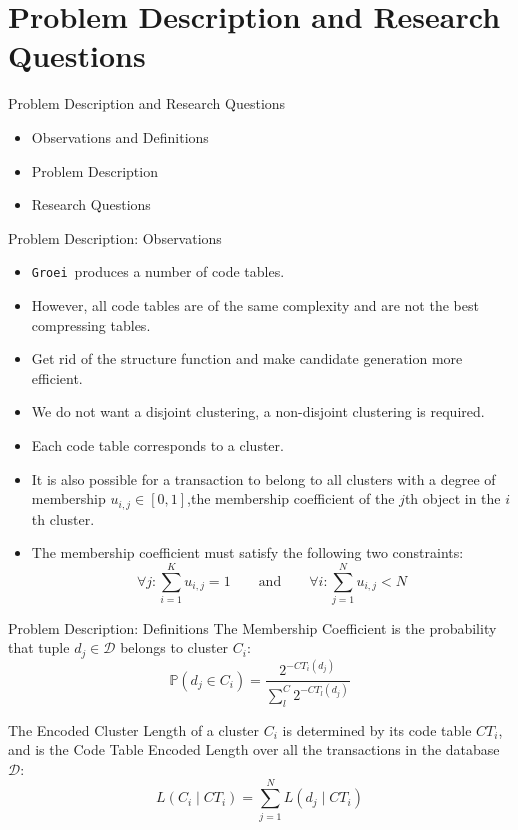 \documentclass{beamer}
\newcommand{\codetable}{CT}
\newcommand{\dataset}{\mathcal{D}}
\newcommand{\groei}{\texttt{Groei}}
\newcommand{\prob}{\mathbb{P}}
\begin{document}
\section{Problem Description and Research Questions}
\begin{frame}{Problem Description and Research Questions}
	\begin{itemize}
		\item Observations and Definitions
		\item Problem Description
		\item Research Questions
	\end{itemize}
\end{frame}

\begin{frame}{Problem Description: Observations}
\begin{itemize}
	\item \groei\ produces a number of code tables.
	\item However, all code tables are of the same complexity and are not the best compressing tables.
	\item Get rid of the structure function and make candidate generation more efficient.
	\item We do not want a disjoint clustering, a non-disjoint clustering is required.
	\item Each code table corresponds to a cluster.
	\item It is also possible for a transaction to belong to all clusters with a degree of membership $u_{i,j} \in [0,1]$,the membership coefficient of the $j$th object in the $i$th cluster. 
	\item The membership coefficient must satisfy the following two constraints: \[\forall j: \sum\limits_{i=1}^{K} u_{i,j} = 1 \qquad\text{and}\qquad \forall i: \sum\limits_{j=1}^{N} u_{i,j} < N\]

\end{itemize}
\end{frame}

\begin{frame}{Problem Description: Definitions}
The Membership Coefficient is the probability that tuple $d_j \in \dataset$ belongs to cluster $C_i$: \[\prob(d_j \in C_i) = \frac{2^{-\codetable_i(d_j)}}{\sum\limits_l^C 2^{-\codetable_l(d_j)}}\]

The Encoded Cluster Length of a cluster $C_i$ is determined by its code table $\codetable_i$, and is the Code Table Encoded Length over all the transactions in the database $\dataset$:
\[L(C_i \mid \codetable_i) = \sum\limits_{j=1}^{N} L(d_j \mid \codetable_i)\]
\end{frame}
\end{document}

